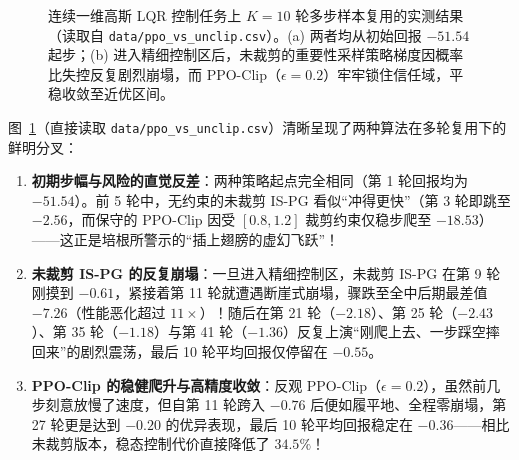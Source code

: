 \begin{figure}[htbp]
\caption{连续一维高斯 LQR 控制任务上 $K=10$ 轮多步样本复用的实测结果（读取自 \texttt{data/ppo\_vs\_unclip.csv}）。(a) 两者均从初始回报 $-51.54$ 起步；(b) 进入精细控制区后，未裁剪的重要性采样策略梯度因概率比失控反复剧烈崩塌，而 PPO-Clip（$\epsilon=0.2$）牢牢锁住信任域，平稳收敛至近优区间。}
\label{fig:ppo-vs-unclip}
\end{figure}

图~\ref{fig:ppo-vs-unclip}（直接读取 \texttt{data/ppo\_vs\_unclip.csv}）清晰呈现了两种算法在多轮复用下的鲜明分叉：
\begin{enumerate}
  \item \textbf{初期步幅与风险的直觉反差}：两种策略起点完全相同（第 1 轮回报均为 \textbf{$-51.54$}）。前 5 轮中，无约束的未裁剪 IS-PG 看似“冲得更快”（第 3 轮即跳至 $-2.56$，而保守的 PPO-Clip 因受 $[0.8, 1.2]$ 裁剪约束仅稳步爬至 $-18.53$）——这正是培根所警示的“插上翅膀的虚幻飞跃”！
  \item \textbf{未裁剪 IS-PG 的反复崩塌}：一旦进入精细控制区，未裁剪 IS-PG 在第 9 轮刚摸到 $-0.61$，紧接着第 11 轮就遭遇断崖式崩塌，骤跌至全中后期最差值 \textbf{$-7.26$}（性能恶化超过 $11\times$）！随后在第 21 轮（$-2.18$）、第 25 轮（$-2.43$）、第 35 轮（$-1.18$）与第 41 轮（$-1.36$）反复上演“刚爬上去、一步踩空摔回来”的剧烈震荡，最后 10 轮平均回报仅停留在 \textbf{$-0.55$}。
  \item \textbf{PPO-Clip 的稳健爬升与高精度收敛}：反观 PPO-Clip（$\epsilon = 0.2$），虽然前几步刻意放慢了速度，但自第 11 轮跨入 $-0.76$ 后便如履平地、全程零崩塌，第 27 轮更是达到 $-0.20$ 的优异表现，最后 10 轮平均回报稳定在 \textbf{$-0.36$}——相比未裁剪版本，稳态控制代价直接降低了 \textbf{$34.5\%$}！
\end{enumerate}

